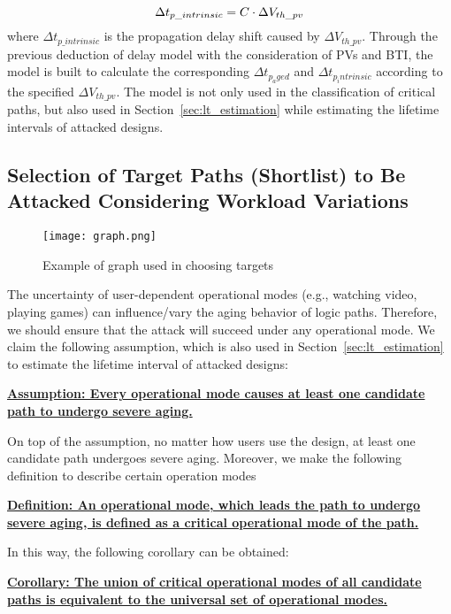 \begin{equation}
	\centering
	\fontsize{9}{9} \selectfont
	\Delta t_{p\_intrinsic} = C \cdot \Delta V_{th\_pv}
	\label{eq:vtodelay2}
\end{equation}	
where $\Delta t_{p\_intrinsic}$ is the propagation delay shift caused by $\Delta V_{th\_pv}$. Through the previous deduction of delay model with the consideration of PVs and BTI, the model is built to calculate the corresponding $\Delta t_{p_aged}$ and $\Delta t_{p_intrinsic}$ according to the specified $\Delta V_{th\_pv}$. The model is not only used in the classification of critical paths, but also used in Section~\ref{sec:lt_estimation} while estimating the lifetime intervals of attacked designs. 
\subsection{Selection of Target Paths (Shortlist) to Be Attacked Considering Workload Variations}
\label{sec:frame:workload}
\begin{figure}
	\centering
	\texttt{[image: graph.png]}
	\caption{Example of graph used in choosing targets}
	\label{fig:graph}
\end{figure}

The uncertainty of user-dependent operational modes (e.g., watching video, playing games) can influence/vary the aging behavior of logic paths. Therefore, we should ensure that the attack will succeed under any operational mode. We claim the following assumption, which is also used in Section~\ref{sec:lt_estimation} to estimate the lifetime interval of attacked designs:

\noindent \textbf{\uline{Assumption: Every operational mode causes at least one candidate path to undergo severe aging.}}

On top of the assumption, no matter how users use the design, at least one candidate path undergoes severe aging. Moreover, we make the following definition to describe certain operation modes

\noindent \textbf{\uline{Definition: An operational mode, which leads the path to undergo severe aging, is defined as a critical operational mode of the path.}}

In this way, the following corollary can be obtained:

\noindent \textbf{\uline{Corollary: The union of critical operational modes of all candidate paths is equivalent to the universal set of operational modes.}}

